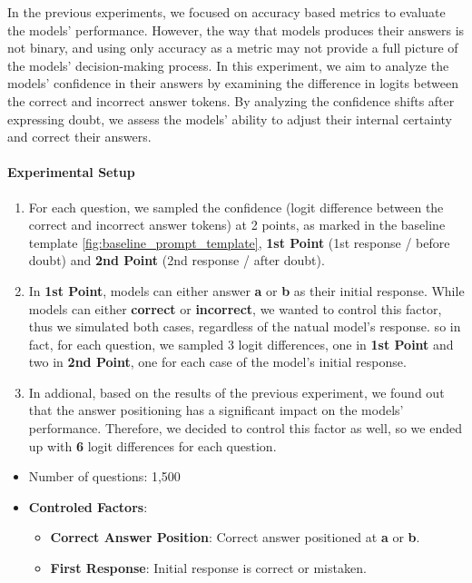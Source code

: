 In the previous experiments, we focused on accuracy based metrics to evaluate the models' performance. However, the way that models produces their answers is not binary, and using only accuracy as a metric may not provide a full picture of the models' decision-making process. In this experiment, we aim to analyze the models' confidence in their answers by examining the difference in logits between the correct and incorrect answer tokens. By analyzing the confidence shifts after expressing doubt, we assess the models' ability to adjust their internal certainty and correct their answers.

\paragraph{Experimental Setup}

\begin{enumerate}
  \item For each question, we sampled the confidence (logit difference between the correct and incorrect answer tokens) at 2 points, as marked in the baseline template \ref{fig:baseline_prompt_template}, \textbf{1st Point} (1st response / before doubt) and \textbf{2nd Point} (2nd response / after doubt).
  \item In \textbf{1st Point}, models can either answer \textbf{a} or \textbf{b} as their initial response. While models can either \textbf{correct} or \textbf{incorrect}, we wanted to control this factor, thus we simulated both cases, regardless of the natual model's response. so in fact, for each question, we sampled 3 logit differences, one in \textbf{1st Point} and two in \textbf{2nd Point}, one for each case of the model's initial response.
  \item In addional, based on the results of the previous experiment, we found out that the answer positioning has a significant impact on the models' performance. Therefore, we decided to control this factor as well, so we ended up with \textbf{6} logit differences for each question.

\end{enumerate}

\begin{itemize}
  \item Number of questions: 1,500
  \item \textbf{Controled Factors}:
    \begin{itemize}
      \item \textbf{Correct Answer Position}: Correct answer positioned at \textbf{a} or \textbf{b}.
      \item \textbf{First Response}: Initial response is correct or mistaken.
    \end{itemize}
\end{itemize}

